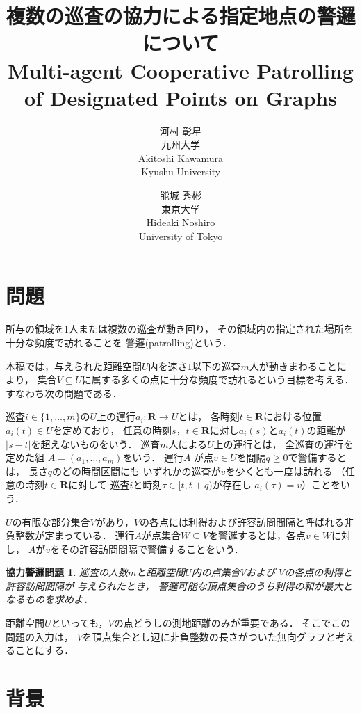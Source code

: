 \documentclass{jss}
\title{%
  {\bfseries\LARGE 複数の巡査の協力による指定地点の警邏について}\\
  {\bfseries\Large Multi-agent Cooperative Patrolling of Designated Points on Graphs}
}
\author{%
  \presenter %
  河村 彰星\\
  九州大学
  \\[6pt]
  Akitoshi Kawamura\\
  Kyushu University\\
  \and
  能城 秀彬\\
  東京大学
  \\[6pt]
  Hideaki Noshiro\\
  University of Tokyo\\
}
\newcommand{\Rset}{\mathbf R}
\newtheorem*{cooperativepatrollingproblem}{協力警邏問題}
\begin{document}
\maketitle


\section{問題}

所与の領域を1人または複数の巡査が動き回り，
その領域内の指定された場所を十分な頻度で訪れることを
警邏(patrolling)という\cite{coene2011charlemagne, czyzowicz2011boundary}．


本稿では，与えられた距離空間$U$内を速さ$1$以下の巡査$m$人が動きまわることにより，
集合$V \subseteq U$に属する多くの点に十分な頻度で訪れるという目標を考える．
すなわち次の問題である．

巡査$i \in \{1, \ldots, m\}$の$U$上の運行$a _i \colon \Rset \to U$とは，
各時刻$t \in \Rset$における位置$a _i (t) \in U$を定めており，
任意の時刻$s$，$t \in \Rset$に対し$a _i (s)$と$a _i (t)$の距離が$\lvert s - t \rvert$を超えないものをいう．
巡査$m$人による$U$上の運行とは，
全巡査の運行を定めた組
$A = (a _1, \dots, a _m)$をいう．
運行$A$%
が点$v \in U$を間隔$q \geq 0$で警備するとは，
長さ$q$のどの時間区間にも
いずれかの巡査が$v$を少くとも一度は訪れる
（任意の時刻$t \in \Rset$に対して
巡査$i$と時刻$\tau \in [t, t + q)$が存在し
$a _i (\tau) = v$）ことをいう．

$U$の有限な部分集合$V$があり，$V$の各点には利得および許容訪問間隔と呼ばれる非負整数が定まっている．
運行$A$が点集合$W \subseteq V$を警邏するとは，各点$v \in W$に対し，
$A$が$v$をその許容訪問間隔で警備することをいう．

\begin{cooperativepatrollingproblem}
    巡査の人数$m$と距離空間$U$内の点集合$V$および
    $V$の各点の利得と許容訪問間隔が
    与えられたとき，
    警邏可能な頂点集合のうち利得の和が最大となるものを求めよ．
\end{cooperativepatrollingproblem}

距離空間$U$といっても，$V$の点どうしの測地距離のみが重要である．
そこでこの問題の入力は，
$V$を頂点集合とし辺に非負整数の長さがついた無向グラフと考えることにする．

\section{背景}
\end{document}
